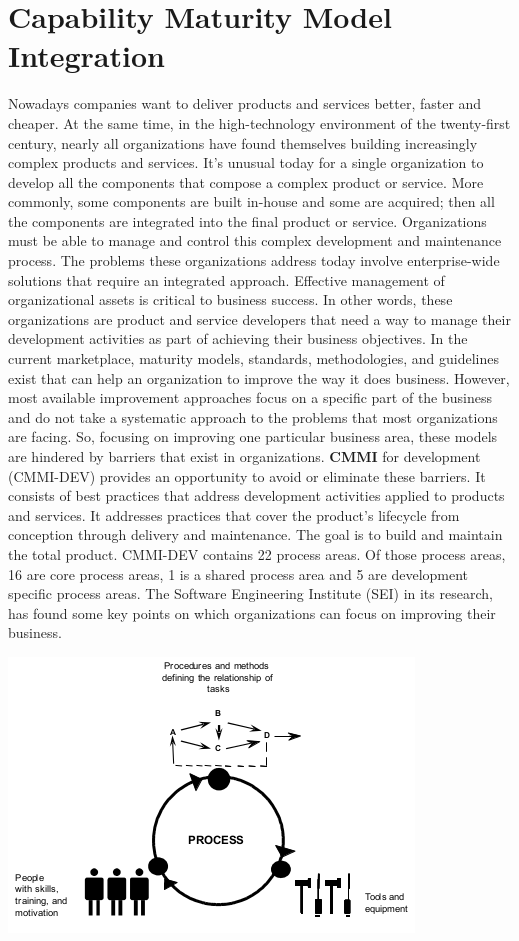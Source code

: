\section{Capability Maturity Model Integration}
Nowadays companies want to deliver products and services better, faster and cheaper.
At the same time, in the high-technology environment of the twenty-first century, nearly all organizations have found themselves building increasingly complex products and services.
It's unusual today for a single organization to develop all the components that compose a complex product or service. More commonly, some components are built in-house and some are acquired; then all the components are integrated into the final product or service.
Organizations must be able to manage and control this complex development and maintenance process.
The problems these organizations address today involve enterprise-wide solutions that require an integrated approach.
Effective management of organizational assets is critical to business success. In other words, these organizations are product and service developers that need a way to manage their development activities as part of achieving their business objectives.
In the current marketplace, maturity models, standards, methodologies, and guidelines exist that can help an organization to improve the way it does business.
However, most available improvement approaches focus on a specific part of the business and do not take a systematic approach to the problems that most organizations are facing.
So, focusing on improving one particular business area, these models are hindered by barriers that exist in organizations.
\textbf{CMMI} for development (CMMI-DEV) provides an opportunity to avoid or eliminate these barriers.
It consists of best practices that address development activities applied to products and services.
It addresses practices that cover the product's lifecycle from conception through delivery and maintenance.
The goal is to build and maintain the total product.
CMMI-DEV contains 22 process areas.
Of those process areas, 16 are core process areas, 1 is a shared process area and 5 are development specific process areas.
The Software Engineering Institute (SEI) in its research, has found some key points on which organizations can focus on improving their business.
\begin{center}
      \includegraphics[scale=0.40]{images/SEI_key_points.png}
\end{center}
